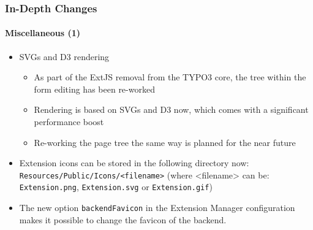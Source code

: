 %
%

\begin{frame}[fragile]
	\frametitle{In-Depth Changes}
	\framesubtitle{Miscellaneous (1)}

	\begin{itemize}

		\item SVGs and D3 rendering

			\begin{itemize}
				\item As part of the ExtJS removal from the TYPO3 core, the tree within the form editing has been re-worked
				\item Rendering is based on SVGs and D3 now, which comes with a significant performance boost
				\item Re-working the page tree the same way is planned for the near future
			\end{itemize}

		\item Extension icons can be stored in the following directory now:\newline
			\small
				\texttt{Resources/Public/Icons/<filename>}
				(where <filename> can be: \texttt{Extension.png}, \texttt{Extension.svg} or \texttt{Extension.gif})
			\normalsize

		\item The new option \texttt{backendFavicon} in the Extension Manager configuration makes it possible to
			change the favicon of the backend.

	\end{itemize}

\end{frame}

